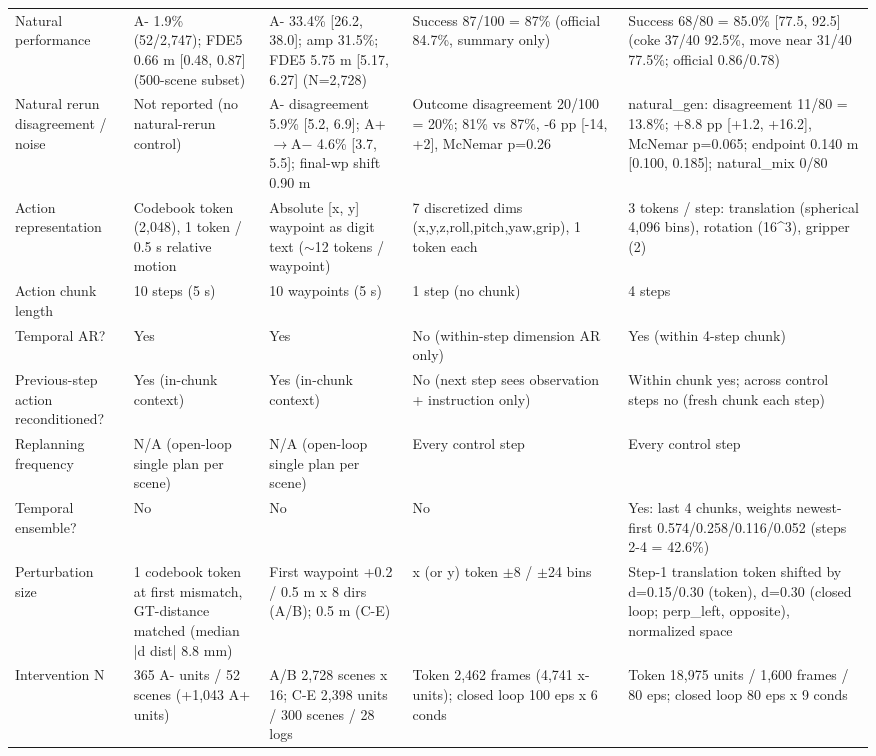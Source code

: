 \begin{table}[t]
{\begin{tabular}{p{2.6cm}p{3.6cm}p{3.6cm}p{3.6cm}p{4.2cm}}
Natural performance & A- 1.9\% (52/2,747); FDE5 0.66 m [0.48, 0.87] (500-scene subset) & A- 33.4\% [26.2, 38.0]; amp 31.5\%; FDE5 5.75 m [5.17, 6.27] (N=2,728) & Success 87/100 = 87\% (official 84.7\%, summary only) & Success 68/80 = 85.0\% [77.5, 92.5] (coke 37/40 92.5\%, move near 31/40 77.5\%; official 0.86/0.78) \\
Natural rerun disagreement / noise & Not reported (no natural-rerun control) & A- disagreement 5.9\% [5.2, 6.9]; A+$\rightarrow$A$-$ 4.6\% [3.7, 5.5]; final-wp shift 0.90 m & Outcome disagreement 20/100 = 20\%; 81\% vs 87\%, -6 pp [-14, +2], McNemar p=0.26 & natural\_gen: disagreement 11/80 = 13.8\%; +8.8 pp [+1.2, +16.2], McNemar p=0.065; endpoint 0.140 m [0.100, 0.185]; natural\_mix 0/80 \\
Action representation & Codebook token (2,048), 1 token / 0.5 s relative motion & Absolute [x, y] waypoint as digit text ($\sim$12 tokens / waypoint) & 7 discretized dims (x,y,z,roll,pitch,yaw,grip), 1 token each & 3 tokens / step: translation (spherical 4,096 bins), rotation (16\^{}3), gripper (2) \\
Action chunk length & 10 steps (5 s) & 10 waypoints (5 s) & 1 step (no chunk) & 4 steps \\
Temporal AR? & Yes & Yes & No (within-step dimension AR only) & Yes (within 4-step chunk) \\
Previous-step action reconditioned? & Yes (in-chunk context) & Yes (in-chunk context) & No (next step sees observation + instruction only) & Within chunk yes; across control steps no (fresh chunk each step) \\
Replanning frequency & N/A (open-loop single plan per scene) & N/A (open-loop single plan per scene) & Every control step & Every control step \\
Temporal ensemble? & No & No & No & Yes: last 4 chunks, weights newest-first 0.574/0.258/0.116/0.052 (steps 2-4 = 42.6\%) \\
Perturbation size & 1 codebook token at first mismatch, GT-distance matched (median |d dist| 8.8 mm) & First waypoint +0.2 / 0.5 m x 8 dirs (A/B); 0.5 m (C-E) & x (or y) token $\pm$8 / $\pm$24 bins & Step-1 translation token shifted by d=0.15/0.30 (token), d=0.30 (closed loop; perp\_left, opposite), normalized space \\
Intervention N & 365 A- units / 52 scenes (+1,043 A+ units) & A/B 2,728 scenes x 16; C-E 2,398 units / 300 scenes / 28 logs & Token 2,462 frames (4,741 x-units); closed loop 100 eps x 6 conds & Token 18,975 units / 1,600 frames / 80 eps; closed loop 80 eps x 9 conds \\

\end{tabular}}
\end{table}
